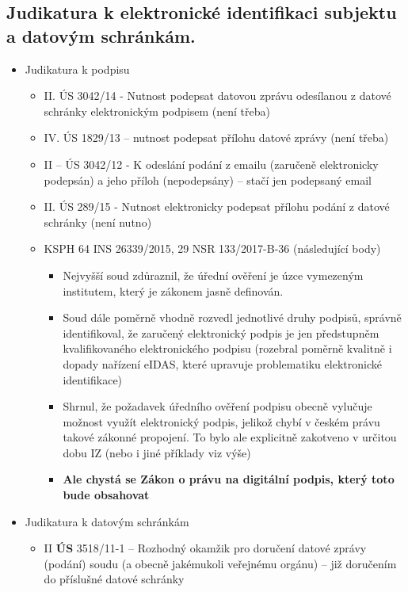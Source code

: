 \subsection{Judikatura k elektronické identifikaci subjektu a datovým schránkám.}
\begin{itemize}
    \item Judikatura k podpisu
    \begin{itemize}
        \item II. ÚS 3042/14 - Nutnost podepsat datovou zprávu odesílanou z datové schránky elektronickým podpisem (není třeba)
        \item IV. ÚS 1829/13 – nutnost podepsat přílohu datové zprávy (není třeba)
        \item II – ÚS 3042/12 - K odeslání podání z emailu (zaručeně elektronicky podepsán) a jeho příloh (nepodepsány) – stačí jen podepsaný email
        \item II. ÚS 289/15 - Nutnost elektronicky podepsat přílohu podání z datové schránky (není nutno)
        \item KSPH 64 INS 26339/2015, 29 NSR 133/2017-B-36 (následující body)
        \begin{itemize}
            \item Nejvyšší soud zdůraznil, že úřední ověření je úzce vymezeným institutem, který je zákonem jasně definován.
            \item Soud dále poměrně vhodně rozvedl jednotlivé druhy podpisů, správně identifikoval, že zaručený elektronický podpis je jen předstupněm kvalifikovaného elektronického podpisu (rozebral poměrně kvalitně i dopady nařízení eIDAS, které upravuje problematiku elektronické identifikace)
            \item Shrnul, že požadavek úředního ověření podpisu obecně vylučuje možnost využít elektronický podpis, jelikož chybí v českém právu takové zákonné propojení. To bylo ale explicitně zakotveno v určitou dobu IZ (nebo i jiné příklady viz výše)
            \item \textbf{Ale chystá se Zákon o právu na digitální podpis, který toto bude obsahovat}
        \end{itemize}
    \end{itemize}
    \item Judikatura k datovým schránkám
    \begin{itemize}
        \item II \textbf{ÚS} 3518/11-1 – Rozhodný okamžik pro doručení datové zprávy (podání) soudu (a obecně jakémukoli veřejnému orgánu) – již doručením do příslušné datové schránky

\end{itemize}
\end{itemize}
